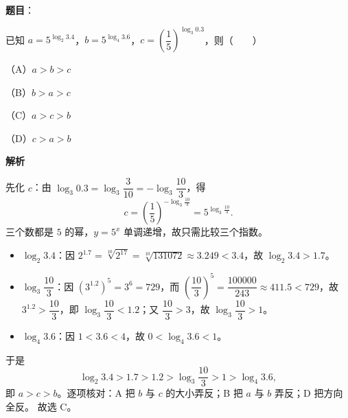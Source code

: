 \begin{answer}

\textbf{题目}：

已知 $a=5^{\log_2 3.4}$，$b=5^{\log_4 3.6}$，$c=\left(\dfrac15\right)^{\log_3 0.3}$，则\mbox{（　　）}

（A）$a>b>c$

（B）$b>a>c$

（C）$a>c>b$

（D）$c>a>b$

\textbf{解析}

先化 $c$：由 $\log_3 0.3=\log_3\dfrac{3}{10}=-\log_3\dfrac{10}{3}$，得
\nopagebreak[4]
\[c=\left(\frac15\right)^{-\log_3\frac{10}{3}}=5^{\log_3\frac{10}{3}}.\]
三个数都是 $5$ 的幂，$y=5^x$ 单调递增，故只需比较三个指数。

\begin{itemize}
\item $\log_2 3.4$：因 $2^{1.7}=\sqrt[10]{2^{17}}=\sqrt[10]{131072}\approx3.249<3.4$，故 $\log_2 3.4>1.7$。
\item $\log_3\dfrac{10}{3}$：因 $\left(3^{1.2}\right)^5=3^6=729$，而 $\left(\dfrac{10}{3}\right)^5=\dfrac{100000}{243}\approx411.5<729$，故 $3^{1.2}>\dfrac{10}{3}$，即 $\log_3\dfrac{10}{3}<1.2$；又 $\dfrac{10}{3}>3$，故 $\log_3\dfrac{10}{3}>1$。
\item $\log_4 3.6$：因 $1<3.6<4$，故 $0<\log_4 3.6<1$。
\end{itemize}

于是
\nopagebreak[4]
\[\log_2 3.4>1.7>1.2>\log_3\frac{10}{3}>1>\log_4 3.6,\]
即 $a>c>b$。逐项核对：A 把 $b$ 与 $c$ 的大小弄反；B 把 $a$ 与 $b$ 弄反；D 把方向全反。
故选 C。


\end{answer}
